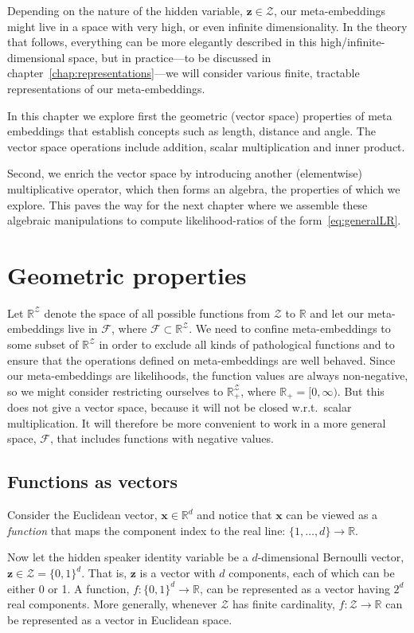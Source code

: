 \documentclass[a4paper,oneside,12pt,english]{report}
\def\zvec{\mathbf{z}}
\def\R{\mathbb{R}}
\def\Zset{\mathcal{Z}}
\def\xvec{\mathbf{x}}
\def\Zset{\mathcal{Z}}
\def\Fset{\mathcal{F}}
\begin{document}
Depending on the nature of the hidden variable, $\zvec\in\Zset$, our meta-embeddings might live in a space with very high, or even infinite dimensionality. In the theory that follows, everything can be more elegantly described in this high/infinite-dimensional space, but in practice---to be discussed in chapter~\ref{chap:representations}---we will consider various finite, tractable representations of our meta-embeddings.

In this chapter we explore first the geometric (vector space) properties of meta embeddings that establish concepts such as length, distance and angle. The vector space operations include addition, scalar multiplication and inner product. 

Second, we enrich the vector space by introducing another (elementwise) multiplicative operator, which then forms an algebra, the properties of which we explore. This paves the way for the next chapter where we assemble these algebraic manipulations to compute likelihood-ratios of the form~\eqref{eq:generalLR}.


\section{Geometric properties}
Let $\R^\Zset$ denote the space of all possible functions from $\Zset$ to $\R$ and let our meta-embeddings live in $\Fset$, where $\Fset\subset\R^{\Zset}$. We need to confine meta-embeddings to some subset of $\R^\Zset$ in order to exclude all kinds of pathological functions and to ensure that the operations defined on meta-embeddings are well behaved. Since our meta-embeddings are likelihoods, the function values are always non-negative, so we might consider restricting ourselves to $\R_+^{\Zset}$, where $\R_+ = [0,\infty)$. But this does not give a vector space, because it will not be closed w.r.t.\ scalar multiplication. It will therefore be more convenient to work in a more general space, $\Fset$, that includes functions with negative values.



\subsection{Functions as vectors}
Consider the Euclidean vector, $\xvec\in\R^d$ and notice that $\xvec$ can be viewed as a \emph{function} that maps the component index to the real line: $\{1,\ldots,d\}\to\R$. 

Now let the hidden speaker identity variable be a $d$-dimensional Bernoulli vector, $\zvec\in\Zset=\{0,1\}^d$. That is, $\zvec$ is a vector with $d$ components, each of which can be either 0 or 1. A function, $f:\{0,1\}^d\to\R$, can be represented as a vector having $2^d$ real components. More generally, whenever $\Zset$ has finite cardinality, $f:\Zset\to\R$ can be represented as a vector in Euclidean space.
\end{document}
